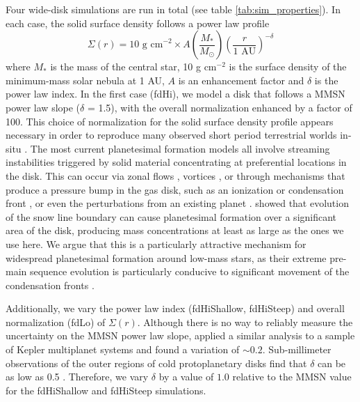 Four wide-disk simulations are run in total (see table \ref{tab:sim_properties}). In each case, the solid surface density follows a power law profile
\begin{equation}
	\Sigma(r) = \textrm{10 g cm}^{-2} \times A \left( \frac{M_{*}}{M_{\odot}} \right) \left( \frac{r}{\textrm{1 AU}} \right)^{-\delta}
\end{equation}
where $M_{*}$ is the mass of the central star, 10 g
cm$^{-2}$ is the surface density of the minimum-mass solar nebula
\cite[MMSN]{hayashi81} at 1 AU, $A$ is an enhancement factor and $\delta$ is the power law index.
In the first case (fdHi), we model a disk that follows a MMSN power law slope ($\delta$ = 1.5), with the overall normalization enhanced by a factor of 100. This choice of normalization for the solid surface density profile appears necessary in order to reproduce many observed short period terrestrial worlds in-situ \cite{hansen12}. The most current planetesimal formation models all involve streaming instabilities triggered by solid material concentrating at preferential locations in the disk. This can occur via zonal flows \cite{johansen2009b, simon12}, vortices \cite{klahr03}, or through mechanisms that produce a pressure bump in the gas disk, such as an ionization \cite{lyra08} or condensation front \cite{brauer08b, drkazowska13}, or even the perturbations from an existing planet \cite{shibaike20}. \cite{drkazowska18} showed that evolution of the snow line boundary can cause planetesimal formation over a significant area of the disk, producing mass concentrations at least as large as the ones we use here. We argue that this is a particularly attractive mechanism for widespread planetesimal formation around low-mass stars, as their extreme pre-main sequence evolution is particularly conducive to significant movement of the condensation fronts \cite{baraffe15}.

Additionally, we vary the power law index (fdHiShallow, fdHiSteep) and overall normalization (fdLo) of $\Sigma(r)$. Although there is no way to reliably measure the uncertainty on the MMSN power law slope, \cite{chiang13} applied a similar analysis to a sample of Kepler multiplanet systems and found a variation of $\sim 0.2$. Sub-millimeter observations of the outer regions of cold protoplanetary disks find that $\delta$ can be as low as 0.5 \cite{mundy00, andrews09, andrews10}. Therefore, we vary $\delta$ by a value of $1.0$ relative to the MMSN value for the fdHiShallow and fdHiSteep simulations.

